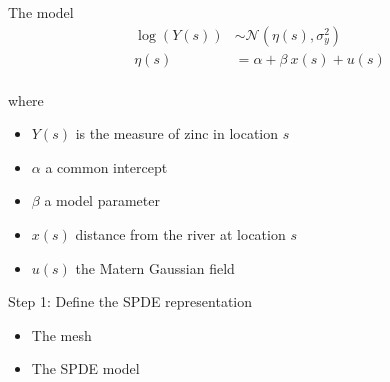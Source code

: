 \documentclass[
  ignorenonframetext,
]{beamer}
\begin{document}
\begin{frame}{The model}
\protect\hypertarget{the-model}{}
\[
\begin{aligned}
\log(Y(s)) &\sim \mathcal{N}(\eta(s),\sigma^2_y)\\
\eta(s)& = \alpha + \beta\ x(s) + u(s)\\
\end{aligned}
\]

where

\begin{itemize}
\item
  \(Y(s)\) is the measure of zinc in location \(s\)
\item
  \(\alpha\) a common intercept
\item
  \(\beta\) a model parameter
\item
  \(x(s)\) distance from the river at location \(s\)
\item
  \(u(s)\) the Matern Gaussian field
\end{itemize}
\end{frame}

\begin{frame}{Step 1: Define the SPDE representation}
\protect\hypertarget{step-1-define-the-spde-representation}{}
\begin{itemize}
\item
  The mesh
\item
  The SPDE model
\end{itemize}
\end{frame}
\end{document}
